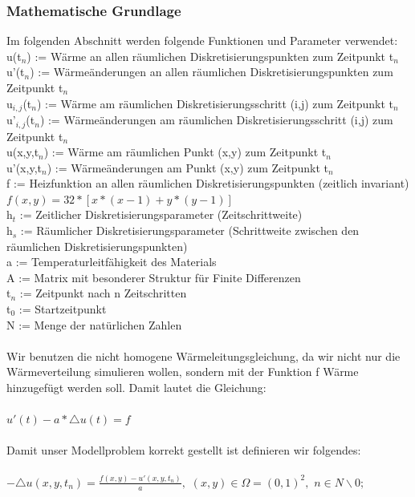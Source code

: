 \documentclass{report}
\begin{document}
\subsubsection{Mathematische Grundlage}
Im folgenden Abschnitt werden folgende Funktionen und Parameter verwendet:\\
u(t$_{n}$) := Wärme an allen räumlichen Diskretisierungspunkten zum Zeitpunkt t$_{n}$\\
u'(t$_{n}$) := Wärmeänderungen an allen räumlichen Diskretisierungspunkten zum Zeitpunkt t$_{n}$\\
u$_{i,j}$(t$_{n}$) := Wärme am räumlichen Diskretisierungsschritt (i,j) zum Zeitpunkt t$_{n}$\\
u'$_{i,j}$(t$_{n}$) := Wärmeänderungen am räumlichen Diskretisierungsschritt (i,j) zum Zeitpunkt t$_{n}$\\
u(x,y,t$_{n}$) := Wärme am räumlichen Punkt (x,y) zum Zeitpunkt t$_{n}$\\
u'(x,y,t$_{n}$) := Wärmeänderungen am Punkt (x,y) zum Zeitpunkt t$_{n}$\\
f := Heizfunktion an allen räumlichen Diskretisierungspunkten (zeitlich invariant) $f(x,y) = 32 * [x*(x-1)+y*(y-1)]$\\
h$_{t}$ := Zeitlicher Diskretisierungsparameter (Zeitschrittweite)\\
h$_{s}$ := Räumlicher Diskretisierungsparameter (Schrittweite zwischen den räumlichen Diskretisierungspunkten)\\
a := Temperaturleitfähigkeit des Materials \\
A := Matrix mit besonderer Struktur für Finite Differenzen\\
t$_{n}$ := Zeitpunkt nach n Zeitschritten\\
t$_{0}$ := Startzeitpunkt\\
N := Menge der natürlichen Zahlen\\
\\
Wir benutzen die nicht homogene Wärmeleitungsgleichung, da wir nicht nur die Wärmeverteilung simulieren wollen, sondern mit der Funktion f Wärme hinzugefügt werden soll. Damit lautet die Gleichung:\\
\\
$u'(t) - a * \triangle u(t) = f$\\
\\
Damit unser Modellproblem korrekt gestellt ist definieren wir folgendes:\\
\\
$- \triangle u(x,y,t_{n}) = \frac{f(x,y)-u'(x,y,t_{n})}{a}   ,$   $  (x,y) \in \Omega = (0,1)^2  ,$   $  n \in N\backslash0;$\\
\end{document}
